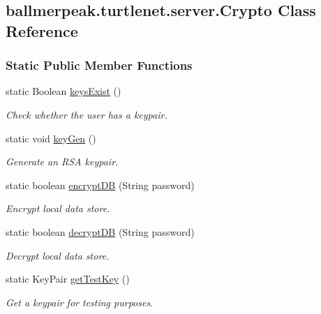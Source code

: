 \hypertarget{classballmerpeak_1_1turtlenet_1_1server_1_1Crypto}{\subsection{ballmerpeak.\-turtlenet.\-server.\-Crypto Class Reference}
\label{classballmerpeak_1_1turtlenet_1_1server_1_1Crypto}
}
\subsubsection*{Static Public Member Functions}
\begin{DoxyCompactItemize}
\item 
static Boolean \hyperlink{classballmerpeak_1_1turtlenet_1_1server_1_1Crypto_a4d363a946bc16a383bb3516a6819e06f}{keys\-Exist} ()
\begin{DoxyCompactList}\small\item\em Check whether the user has a keypair. \end{DoxyCompactList}\item 
static void \hyperlink{classballmerpeak_1_1turtlenet_1_1server_1_1Crypto_ae3a1070020af2f98bfb23284115f1b97}{key\-Gen} ()
\begin{DoxyCompactList}\small\item\em Generate an R\-S\-A keypair. \end{DoxyCompactList}\item 
static boolean \hyperlink{classballmerpeak_1_1turtlenet_1_1server_1_1Crypto_a028cefbca14291fa686b27c36f3b212a}{encrypt\-D\-B} (String password)
\begin{DoxyCompactList}\small\item\em Encrypt local data store. \end{DoxyCompactList}\item 
static boolean \hyperlink{classballmerpeak_1_1turtlenet_1_1server_1_1Crypto_a0faed916bbc35f2f01c4a09a52c008df}{decrypt\-D\-B} (String password)
\begin{DoxyCompactList}\small\item\em Decrypt local data store. \end{DoxyCompactList}\item 
static Key\-Pair \hyperlink{classballmerpeak_1_1turtlenet_1_1server_1_1Crypto_a2e95210ca85eb6273d47a1bde6be22e4}{get\-Test\-Key} ()
\begin{DoxyCompactList}\small\item\em Get a keypair for testing purposes. \end{DoxyCompactList}\item 

\end{DoxyCompactItemize}
